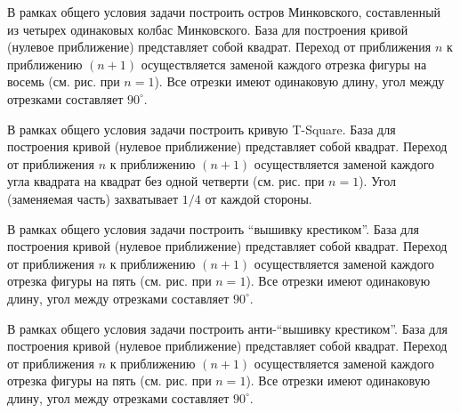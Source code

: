 
\begin{zztask}
В рамках общего условия задачи построить остров Минковского, составленный из
четырех одинаковых колбас Минковского. База для построения кривой 
(нулевое приближение) представляет собой квадрат.
Переход от приближения $n$ к приближению $(n+1)$ осуществляется заменой каждого 
отрезка фигуры на восемь (см. рис. при $n=1$). 
Все отрезки имеют одинаковую длину, угол между отрезками составляет $90^\circ$.
\par
\end{zztask}


\begin{zztask}
В рамках общего условия задачи построить кривую T-Square.
База для построения кривой (нулевое приближение) представляет собой квадрат.
Переход от приближения $n$ к приближению $(n+1)$ осуществляется заменой каждого 
угла квадрата на квадрат без одной четверти (см. рис. при $n=1$). 
Угол (заменяемая часть) захватывает $1/4$ от каждой стороны.
\par
\end{zztask}


\begin{zztask}
В рамках общего условия задачи построить ``вышивку крестиком''.
База для построения кривой (нулевое приближение) представляет собой квадрат.
Переход от приближения $n$ к приближению $(n+1)$ осуществляется заменой каждого 
отрезка фигуры на пять (см. рис. при $n=1$). 
Все отрезки имеют одинаковую длину, угол между отрезками составляет $90^\circ$.
\par
\end{zztask}


\begin{zztask}
В рамках общего условия задачи построить анти-``вышивку крестиком''.
База для построения кривой (нулевое приближение) представляет собой квадрат.
Переход от приближения $n$ к приближению $(n+1)$ осуществляется заменой каждого 
отрезка фигуры на пять (см. рис. при $n=1$). 
Все отрезки имеют одинаковую длину, угол между отрезками составляет $90^\circ$.
\par
\end{zztask}

